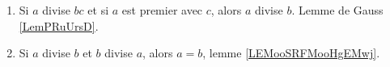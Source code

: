\begin{enumerate}
\item
Si \( a\) divise \( bc\) et si \( a\) est premier avec \( c\), alors \( a\) divise \( b\). Lemme de Gauss \ref{LemPRuUrsD}.
\item
Si \( a\) divise \( b\) et \( b\) divise \( a\), alors \( a=b\), lemme \ref{LEMooSRFMooHgEMwj}.
\end{enumerate}

